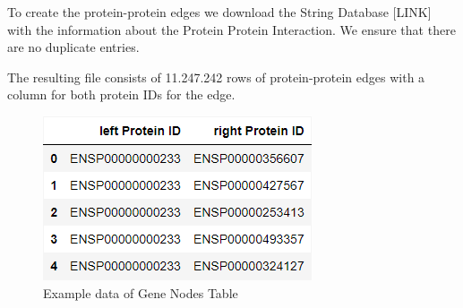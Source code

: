 To create the protein-protein edges we download the String Database [LINK] with the information about the Protein Protein Interaction.
We ensure that there are no duplicate entries.

The resulting file consists of 11.247.242 rows of protein-protein edges with a column for both protein IDs for the edge.
\begin{figure}[h]
\centering
\includegraphics[scale=0.5]{figures/03_02_protein_edges}
\caption{Example data of Gene Nodes Table}
\label{fig:03_02_protein_edges}
\end{figure}


